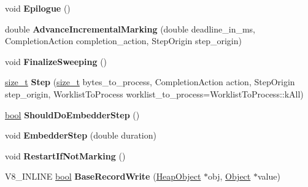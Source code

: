 \begin{DoxyCompactItemize}
\item 
\mbox{\label{classv8_1_1internal_1_1IncrementalMarking_a3e08d2a488e382eb05b072daf089d0ed}} 
void {\bfseries Epilogue} ()
\item 
\mbox{\label{classv8_1_1internal_1_1IncrementalMarking_a4fa2893b35dfca0d3f82afee04834835}} 
double {\bfseries Advance\+Incremental\+Marking} (double deadline\+\_\+in\+\_\+ms, Completion\+Action completion\+\_\+action, Step\+Origin step\+\_\+origin)
\item 
\mbox{\label{classv8_1_1internal_1_1IncrementalMarking_a046c867da14b0d0c24adf418275e9b10}} 
void {\bfseries Finalize\+Sweeping} ()
\item 
\mbox{\label{classv8_1_1internal_1_1IncrementalMarking_a35e0a991c2b524f8f23bf7e1bde5c6fb}} 
\mbox{\hyperlink{classsize__t}{size\+\_\+t}} {\bfseries Step} (\mbox{\hyperlink{classsize__t}{size\+\_\+t}} bytes\+\_\+to\+\_\+process, Completion\+Action action, Step\+Origin step\+\_\+origin, Worklist\+To\+Process worklist\+\_\+to\+\_\+process=Worklist\+To\+Process\+::k\+All)
\item 
\mbox{\label{classv8_1_1internal_1_1IncrementalMarking_a5b22af001833834d007837570fb0633c}} 
\mbox{\hyperlink{classbool}{bool}} {\bfseries Should\+Do\+Embedder\+Step} ()
\item 
\mbox{\label{classv8_1_1internal_1_1IncrementalMarking_a067f4505edd1ca48c0c0f4f3dc5e4891}} 
void {\bfseries Embedder\+Step} (double duration)
\item 
\mbox{\label{classv8_1_1internal_1_1IncrementalMarking_a704af5ad518fd3c4e751a1f286b8e89d}} 
void {\bfseries Restart\+If\+Not\+Marking} ()
\item 
\mbox{\label{classv8_1_1internal_1_1IncrementalMarking_a88dfb6e00a95628ed54c2a15ceb5831d}} 
V8\+\_\+\+I\+N\+L\+I\+NE \mbox{\hyperlink{classbool}{bool}} {\bfseries Base\+Record\+Write} (\mbox{\hyperlink{classv8_1_1internal_1_1HeapObject}{Heap\+Object}} $\ast$obj, \mbox{\hyperlink{classv8_1_1internal_1_1Object}{Object}} $\ast$value)

\end{DoxyCompactItemize}
